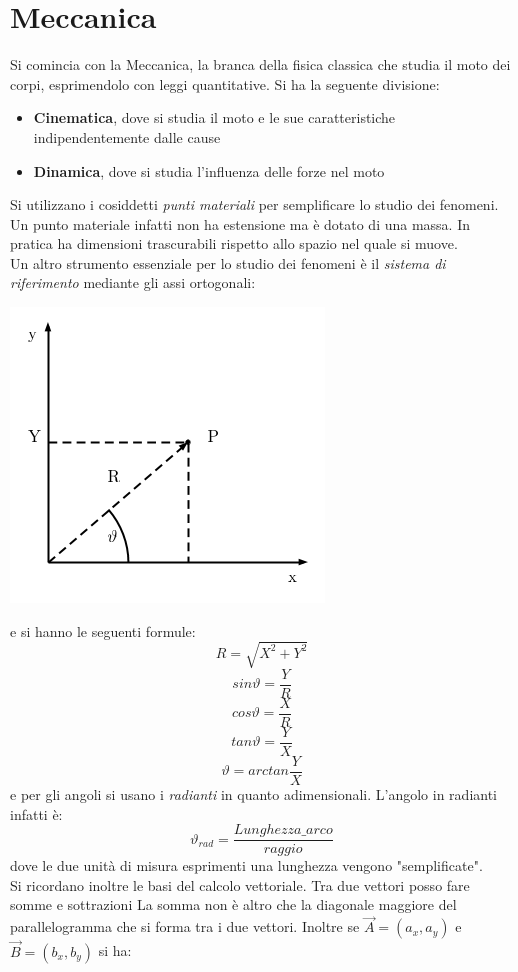 \documentclass[a4paper,12pt, oneside]{book}
\begin{document}
\chapter{Meccanica}
Si comincia con la Meccanica, la branca della fisica classica che studia il moto dei corpi, esprimendolo con leggi quantitative. Si ha la seguente divisione:
\begin{itemize}
	\item \textbf{Cinematica}, dove si studia il moto e le sue caratteristiche indipendentemente dalle cause
	\item \textbf{Dinamica}, dove si studia l'influenza delle forze nel moto
\end{itemize}
Si utilizzano i cosiddetti \textit{punti materiali} per semplificare lo studio dei fenomeni. Un punto materiale infatti non ha estensione ma è dotato di una massa. In pratica ha dimensioni trascurabili rispetto allo spazio nel quale si muove.\\
Un altro strumento essenziale per lo studio dei fenomeni è il \textit{sistema di riferimento} mediante gli assi ortogonali:
\begin{center}
	\includegraphics[scale=0.7]{img/ref.png}
\end{center}
\newpage
e si hanno le seguenti formule:
$$R=\sqrt{X^2+Y^2}$$
$$sin \vartheta=\frac{Y}{R}$$
$$cos \vartheta=\frac{X}{R}$$
$$tan \vartheta = \frac{Y}{X}$$
$$\vartheta= arctan \frac{Y}{X}$$
e per gli angoli si usano i \textit{radianti} in quanto adimensionali. L'angolo in radianti infatti è:
$$\vartheta_{rad}=\frac{Lunghezza\_arco}{raggio}$$
dove le due unità di misura esprimenti una lunghezza vengono "semplificate".\\
Si ricordano inoltre le basi del calcolo vettoriale. Tra due vettori posso fare somme e sottrazioni
La somma non è altro che la diagonale maggiore del parallelogramma che si forma tra i due vettori. Inoltre se $\vec{A}=(a_x,a_y)$ e $\vec{B}=(b_x,b_y)$ si ha:
\end{document}
